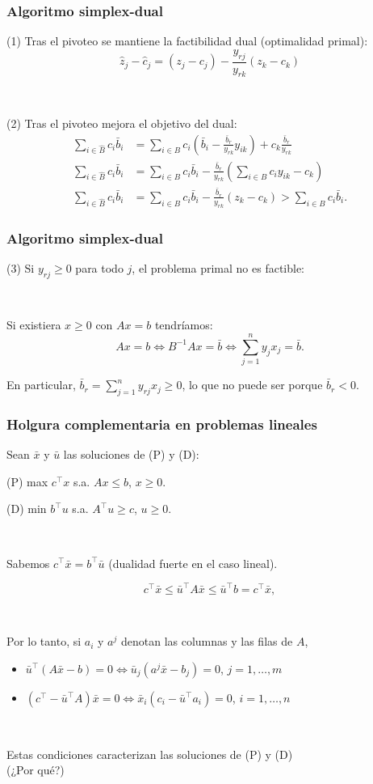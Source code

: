 \documentclass{beamer}
\begin{document}
\begin{frame}
\frametitle{Algoritmo simplex-dual}

(1) Tras el pivoteo se mantiene la factibilidad dual (optimalidad primal):
\[
\hat{z}_j - \hat{c}_j = (z_j-c_j) - \frac{y_{rj}}{y_{rk}} (z_k-c_k)
\]

\

(2) Tras el pivoteo mejora el objetivo del dual:
\begin{align*}
\sum_{i\in \hat{B}} c_i\bar{b}_i &=  \sum_{i\in B} c_i\left(\bar{b}_i - \frac{\bar{b}_r}{y_{rk}}y_{ik} \right) + c_k\frac{\bar{b}_r}{y_{rk}}\\
\sum_{i\in \hat{B}} c_i\bar{b}_i &= \sum_{i\in B} c_i\bar{b}_i - \frac{\bar{b}_r}{y_{rk}} ( \sum_{i\in B} c_iy_{ik} - c_k)\\
\sum_{i\in \hat{B}} c_i\bar{b}_i &= \sum_{i\in B} c_i\bar{b}_i - \frac{\bar{b}_r}{y_{rk}} ( z_k - c_k) > \sum_{i\in B} c_i\bar{b}_i.
\end{align*}

\end{frame}
\begin{frame}
\frametitle{Algoritmo simplex-dual}

(3) Si $y_{rj}\geq 0$ para todo $j$, el problema primal no es factible:

\

Si existiera $x\geq 0$ con $Ax=b$ tendríamos:
\[
Ax=b \Leftrightarrow B^{-1}Ax = \bar{b} \Leftrightarrow \sum_{j=1}^n y_j x_j = \bar{b}.
\]

En particular, $\bar{b}_r = \sum_{j=1}^n y_{rj} x_j\geq 0$, lo que no puede ser porque $\bar{b}_r<0$.
\end{frame}
\begin{frame}
\frametitle{Holgura complementaria en problemas lineales}

Sean $\bar{x}$ y $\bar{u}$ las soluciones de (P) y (D):

(P) max $c^\top x$ s.a. $Ax\leq b$, $x\geq 0$.

(D) min $b^\top u$ s.a. $A^\top u\geq c$, $u\geq 0$.

\

 Sabemos $c^\top \bar{x}=b^\top \bar{u}$ (dualidad fuerte en el caso lineal).
 

\[
c^\top \bar{x} \leq \bar{u}^\top A\bar{x} \leq \bar{u}^\top b = c^\top \bar{x},
\]

\

Por lo tanto, si $a_i$ y $a^j$ denotan las columnas y las filas de $A$,
\begin{itemize}
\item $\bar{u}^\top(A\bar{x}-b)=0 \Leftrightarrow \bar{u}_j(a^j\bar{x}-b_j)=0$, $j=1,\ldots,m$
\item $(c^\top-\bar{u}^\top A)\bar{x}=0 \Leftrightarrow \bar{x}_i(c_i-\bar{u}^\top a_i)=0$, $i=1,\ldots,n$
\end{itemize} 

\

Estas condiciones caracterizan las soluciones de (P) y (D)\\ (¿Por qué?)

\end{frame}
\end{document}
